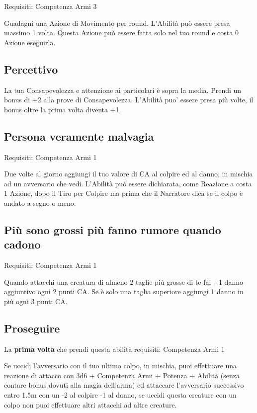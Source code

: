 \documentclass[a4paper,11pt,twoside,openany]{book}
\begin{document}
Requisiti: Competenza Armi 3

Guadagni una Azione di Movimento per round. L'Abilità può essere presa massimo 1 volta. Questa Azione può essere fatta solo nel tuo round e costa 0 Azione eseguirla.

\subsection{Percettivo}

La tua Consapevolezza e attenzione ai particolari è sopra la media.
Prendi un bonus di +2 alla prove di Consapevolezza. L'Abilità puo'
essere presa più volte, il bonus oltre la prima volta diventa +1.

\subsection{Persona veramente malvagia}

Requisiti: Competenza Armi 1

Due volte al giorno aggiungi il tuo valore di CA al colpire ed al danno, in mischia ad un avversario che vedi. L'Abilità può essere dichiarata, come Reazione a costa 1 Azione, dopo il Tiro per Colpire ma prima che il Narratore dica se il colpo è andato a segno o meno.

\subsection{Più sono grossi più fanno rumore quando cadono}

Requisiti: Competenza Armi 1

Quando attacchi una creatura di almeno 2 taglie più grosse di te fai +1 danno aggiuntivo ogni 2 punti CA. Se è solo una taglia superiore aggiungi 1 danno in più ogni 3 punti CA.

\subsection{Proseguire}

La \textbf{prima volta} che prendi questa abilità requisiti: Competenza Armi 1

Se uccidi l'avversario con il tuo ultimo colpo, in mischia, puoi effettuare una reazione di attacco con 3d6 + Competenza Armi + Potenza + Abilità (senza contare bonus dovuti alla magia dell'arma) ed attaccare l'avversario successivo entro 1.5m con un -2 al colpire -1 al danno, se uccidi questa creature con un colpo non puoi effettuare altri attacchi ad altre creature.
\end{document}
